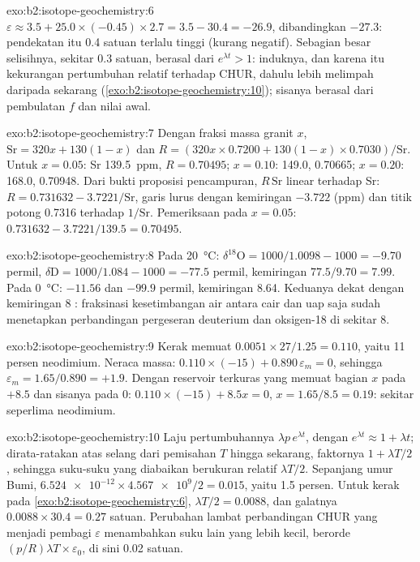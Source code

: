 \begin{solution}{exo:b2:isotope-geochemistry:6}
$\varepsilon \approx 3.5 + 25.0\times(-0.45)\times2.7 = 3.5 - 30.4 = -26.9$, dibandingkan
$-27.3$: pendekatan itu 0.4 satuan terlalu tinggi (kurang negatif). Sebagian besar
selisihnya, sekitar 0.3 satuan, berasal dari $e^{\lambda t} > 1$: induknya, dan karena itu
kekurangan pertumbuhan relatif terhadap CHUR, dahulu lebih melimpah daripada sekarang
(\cref{exo:b2:isotope-geochemistry:10}); sisanya berasal dari pembulatan $f$ dan nilai awal.
\end{solution}

\begin{solution}{exo:b2:isotope-geochemistry:7}
Dengan fraksi massa granit $x$, $\mathrm{Sr} = 320x + 130(1-x)$ dan
$R = (320x\times0.7200 + 130(1-x)\times0.7030)/\mathrm{Sr}$. Untuk $x = 0.05$: Sr
\qty{139.5}{ppm}, $R = 0.70495$; $x = 0.10$: 149.0, 0.70665; $x = 0.20$: 168.0,
0.70948. Dari bukti proposisi pencampuran, $R\,\mathrm{Sr}$ linear terhadap Sr:
$R = 0.731632 - 3.7221/\mathrm{Sr}$, garis lurus dengan kemiringan $-3.722$ (ppm) dan
titik potong 0.7316 terhadap $1/\mathrm{Sr}$. Pemeriksaan pada $x = 0.05$: $0.731632 - 3.7221/139.5
= 0.70495$.
\end{solution}

\begin{solution}{exo:b2:isotope-geochemistry:8}
Pada \qty{20}{\degreeCelsius}: $\delta^{18}\mathrm{O} = 1000/1.0098 - 1000 = -9.70$
permil, $\delta\mathrm{D} = 1000/1.084 - 1000 = -77.5$ permil, kemiringan $77.5/9.70 = 7.99$.
Pada \qty{0}{\degreeCelsius}: $-11.56$ dan $-99.9$ permil, kemiringan 8.64. Keduanya dekat dengan
kemiringan 8 : fraksinasi kesetimbangan air
antara cair dan uap saja sudah menetapkan perbandingan pergeseran deuterium dan oksigen-18
di sekitar 8.
\end{solution}

\begin{solution}{exo:b2:isotope-geochemistry:9}
Kerak memuat $0.0051\times27/1.25 = 0.110$, yaitu 11 persen neodimium. Neraca
massa: $0.110\times(-15) + 0.890\,\varepsilon_m = 0$, sehingga $\varepsilon_m = 1.65/0.890 =
+1.9$. Dengan reservoir terkuras yang memuat bagian $x$ pada $+8.5$ dan sisanya pada 0:
$0.110\times(-15) + 8.5x = 0$, $x = 1.65/8.5 = 0.19$: sekitar seperlima
neodimium.
\end{solution}

\begin{solution}{exo:b2:isotope-geochemistry:10}
Laju pertumbuhannya $\lambda p\,e^{\lambda t}$, dengan $e^{\lambda t} \approx 1 + \lambda t$;
dirata-ratakan atas selang dari pemisahan $T$ hingga sekarang, faktornya
$1 + \lambda T/2$, sehingga suku-suku yang diabaikan berukuran relatif $\lambda T/2$. Sepanjang
umur Bumi, $\num{6.524e-12}\times\num{4.567e9}/2 = 0.015$, yaitu 1.5 persen. Untuk
kerak pada \cref{exo:b2:isotope-geochemistry:6}, $\lambda T/2 = 0.0088$, dan galatnya $0.0088\times30.4 = 0.27$
satuan. Perubahan lambat perbandingan CHUR yang menjadi pembagi $\varepsilon$ menambahkan
suku lain yang lebih kecil, berorde $(p/R)\lambda T \times \varepsilon_0$, di sini 0.02 satuan.
\end{solution}

